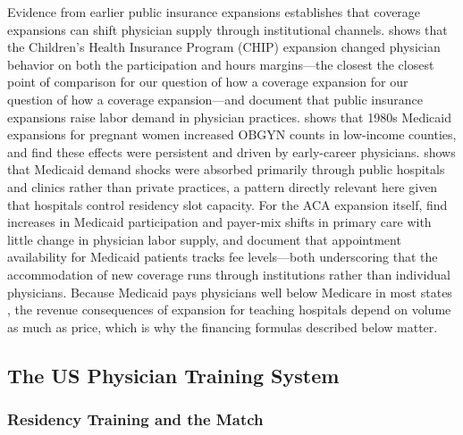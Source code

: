 Evidence from earlier public insurance expansions establishes that coverage expansions can shift physician supply through institutional channels. \textcite{garthwaite2012} shows that the Children's Health Insurance Program (CHIP) expansion changed physician behavior on both the participation and hours margins---the closest the closest point of comparison for our question of how a coverage expansion for our question of how a coverage expansion---and \textcite{barnes2023} document that public insurance expansions raise labor demand in physician practices. \textcite{qian2024} shows that 1980s Medicaid expansions for pregnant women increased OBGYN counts in low-income counties, and \textcite{huh2024} find these effects were persistent and driven by early-career physicians. \textcite{baker2000} shows that Medicaid demand shocks were absorbed primarily through public hospitals and clinics rather than private practices, a pattern directly relevant here given that hospitals control residency slot capacity. For the ACA expansion itself, \textcite{neprash2021} find increases in Medicaid participation and payer-mix shifts in primary care with little change in physician labor supply, and \textcite{candon2018} document that appointment availability for Medicaid patients tracks fee levels---both underscoring that the accommodation of new coverage runs through institutions rather than individual physicians. Because Medicaid pays physicians well below Medicare in most states \autocite{zuckerman2021}, the revenue consequences of expansion for teaching hospitals depend on volume as much as price, which is why the financing formulas described below matter.

\subsection{The US Physician Training System}\label{sec:training}

\subsubsection{Residency Training and the Match}

